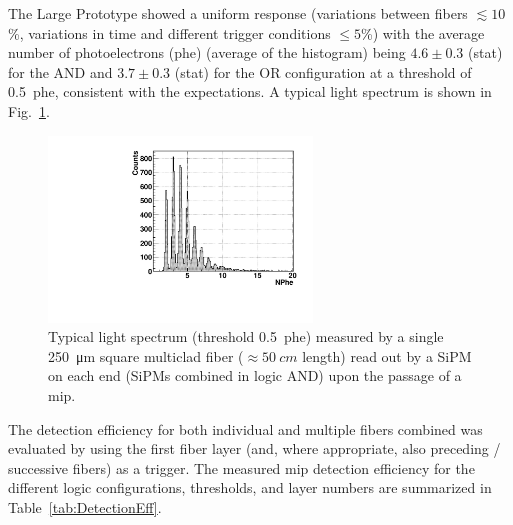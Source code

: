 \begin{refsection}
        The Large Prototype showed a uniform response (variations between fibers $\lesssim10$\thinspace\%, variations in time and different trigger conditions $\leq 5$\thinspace\%) with the average number of photoelectrons (phe) (average of the histogram) being $4.6\pm0.3$ (stat) for the AND and $3.7\pm0.3$ (stat) for the OR configuration at a threshold of 0.5~phe, consistent with the expectations. A typical light spectrum is shown in Fig.~\ref{fig:ChargeSpectrumAND}.
        \begin{figure}
        	\centering
        	\includegraphics[width=7cm]{Figures/muEDM/prototype/prototype_positrons.pdf}
        	\caption{Typical light spectrum (threshold 0.5~phe) measured by a single \SI{250}{\micro m} square multiclad fiber ($\approx \SI{50}{cm}$ length) read out by a SiPM on each end (SiPMs combined in logic AND) upon the passage of a mip.}
        	\label{fig:ChargeSpectrumAND}
        \end{figure}
        
        The detection efficiency for both individual and multiple fibers combined was evaluated by using the first fiber layer (and, where appropriate, also preceding / successive fibers) as a trigger. The measured mip detection efficiency for the different logic configurations, thresholds, and layer numbers are summarized in Table~\ref{tab:DetectionEff}.
        

\end{refsection}
